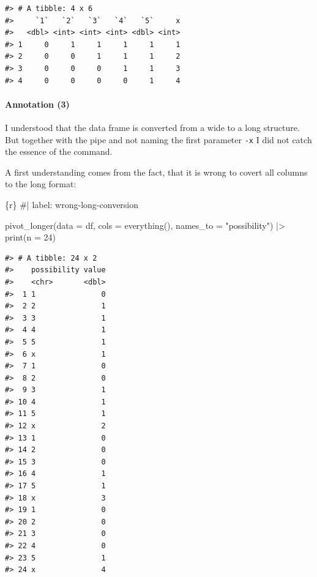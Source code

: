 \documentclass[
  letterpaper,
  DIV=11,
  numbers=noendperiod]{scrreprt}
\let\oldparagraph\paragraph
\renewcommand{\paragraph}[1]{\oldparagraph{#1}\mbox{}}
\newenvironment{Shaded}{\begin{snugshade}}{\end{snugshade}}
\newcommand{\AttributeTok}[1]{\textcolor[rgb]{0.40,0.45,0.13}{#1}}
\newcommand{\CommentTok}[1]{\textcolor[rgb]{0.37,0.37,0.37}{#1}}
\newcommand{\DecValTok}[1]{\textcolor[rgb]{0.68,0.00,0.00}{#1}}
\newcommand{\FunctionTok}[1]{\textcolor[rgb]{0.28,0.35,0.67}{#1}}
\newcommand{\InformationTok}[1]{\textcolor[rgb]{0.37,0.37,0.37}{#1}}
\newcommand{\NormalTok}[1]{\textcolor[rgb]{0.00,0.23,0.31}{#1}}
\newcommand{\SpecialCharTok}[1]{\textcolor[rgb]{0.37,0.37,0.37}{#1}}
\newcommand{\StringTok}[1]{\textcolor[rgb]{0.13,0.47,0.30}{#1}}
\begin{document}
\begin{verbatim}
#> # A tibble: 4 x 6
#>     `1`   `2`   `3`   `4`   `5`     x
#>   <dbl> <int> <int> <int> <dbl> <int>
#> 1     0     1     1     1     1     1
#> 2     0     0     1     1     1     2
#> 3     0     0     0     1     1     3
#> 4     0     0     0     0     1     4
\end{verbatim}

\hypertarget{annotation-3}{%
\paragraph{Annotation (3)}\label{annotation-3}}

I understood that the data frame is converted from a wide to a long
structure. But together with the pipe and not naming the first parameter
\texttt{-x} I did not catch the essence of the command.

A first understanding comes from the fact, that it is wrong to covert
all columns to the long format:

\begin{Shaded}
\begin{Highlighting}[]
\InformationTok{\textasciigrave{}\textasciigrave{}\textasciigrave{}\{r\}}
\CommentTok{\#| label: wrong{-}long{-}conversion}

\FunctionTok{pivot\_longer}\NormalTok{(}\AttributeTok{data =}\NormalTok{ df, }\AttributeTok{cols =} \FunctionTok{everything}\NormalTok{(), }\AttributeTok{names\_to =} \StringTok{"possibility"}\NormalTok{) }\SpecialCharTok{|\textgreater{}} 
    \FunctionTok{print}\NormalTok{(}\AttributeTok{n =} \DecValTok{24}\NormalTok{)}
\InformationTok{\textasciigrave{}\textasciigrave{}\textasciigrave{}}
\end{Highlighting}
\end{Shaded}

\begin{verbatim}
#> # A tibble: 24 x 2
#>    possibility value
#>    <chr>       <dbl>
#>  1 1               0
#>  2 2               1
#>  3 3               1
#>  4 4               1
#>  5 5               1
#>  6 x               1
#>  7 1               0
#>  8 2               0
#>  9 3               1
#> 10 4               1
#> 11 5               1
#> 12 x               2
#> 13 1               0
#> 14 2               0
#> 15 3               0
#> 16 4               1
#> 17 5               1
#> 18 x               3
#> 19 1               0
#> 20 2               0
#> 21 3               0
#> 22 4               0
#> 23 5               1
#> 24 x               4
\end{verbatim}
\end{document}
